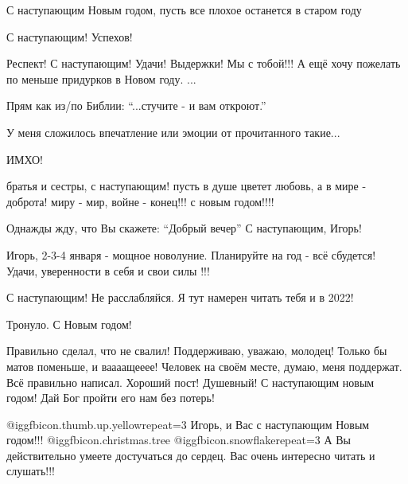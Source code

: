\begin{itemize}
С наступающим Новым годом, пусть все плохое останется в старом году


С наступающим! Успехов!


Респект! С наступающим! Удачи! Выдержки! Мы с тобой!!! А ещё хочу пожелать по
меньше придурков  в Новом году. ...


Прям как из/по Библии: \enquote{...стучите - и вам откроют.}

У меня сложилось впечатление или эмоции от прочитанного такие...

ИМХО!


братья и сестры, с наступающим! пусть в душе цветет любовь, а в мире - доброта!
миру - мир, войне - конец!!! с новым годом!!!!


Однажды жду, что Вы скажете: \enquote{Добрый вечер} С наступающим, Игорь!


Игорь, 2-3-4 января - мощное новолуние. Планируйте на год - всё сбудется!
Удачи, уверенности в себя и свои силы !!!


С наступающим! Не расслабляйся. Я тут намерен читать тебя и в 2022!


Тронуло. С Новым годом!


Правильно сделал, что не свалил! Поддерживаю, уважаю, молодец! Только бы матов
поменьше, и ваааащееее! Человек на своём месте, думаю, меня поддержат. Всё
правильно написал. Хороший пост! Душевный! С наступающим новым годом! Дай Бог
пройти его нам без потерь!


@igg{fbicon.thumb.up.yellow}{repeat=3}  Игорь, и Вас с наступающим Новым
годом!!! @igg{fbicon.christmas.tree} @igg{fbicon.snowflake}{repeat=3} А Вы
действительно умеете достучаться до сердец. Вас очень интересно читать и
слушать!!!

\end{itemize} %
